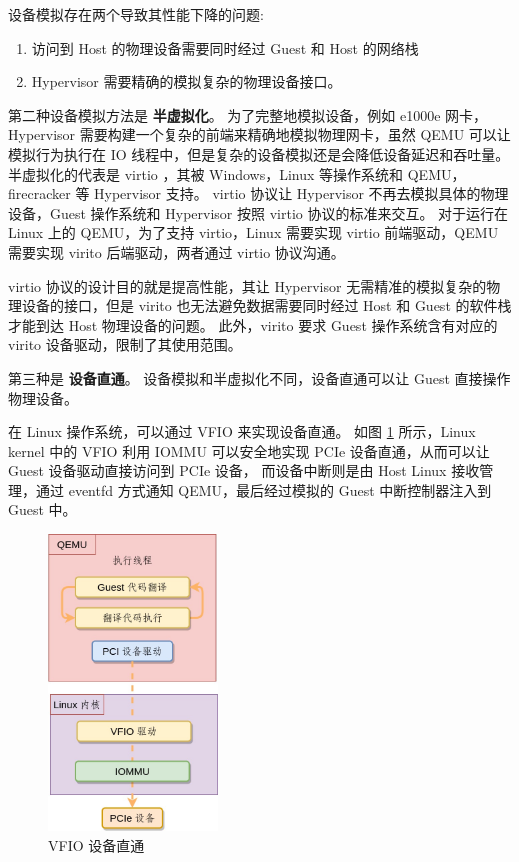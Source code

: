 设备模拟存在两个导致其性能下降的问题:
\begin{enumerate}
	\item 访问到 Host 的物理设备需要同时经过 Guest 和 Host 的网络栈
	\item Hypervisor 需要精确的模拟复杂的物理设备接口。
\end{enumerate}

第二种设备模拟方法是 \textbf{半虚拟化}。
为了完整地模拟设备，例如 e1000e 网卡，Hypervisor 需要构建一个复杂的前端来精确地模拟物理网卡，虽然 QEMU 可以让模拟行为执行在 IO 线程中，但是复杂的设备模拟还是会降低设备延迟和吞吐量。
半虚拟化的代表是 virtio \citep{russell2008virtio}，其被 Windows，Linux 等操作系统和 QEMU，firecracker 等 Hypervisor 支持。
virtio 协议让 Hypervisor 不再去模拟具体的物理设备，Guest 操作系统和 Hypervisor 按照 virtio 协议的标准来交互。
对于运行在 Linux 上的 QEMU，为了支持 virtio，Linux 需要实现 virtio 前端驱动，QEMU 需要实现 virito 后端驱动，两者通过 virtio 协议沟通。

virtio 协议的设计目的就是提高性能，其让 Hypervisor 无需精准的模拟复杂的物理设备的接口，但是 virito 也无法避免数据需要同时经过 Host 和 Guest 的软件栈才能到达 Host 物理设备的问题。
此外，virito 要求 Guest 操作系统含有对应的 virito 设备驱动，限制了其使用范围。

第三种是 \textbf{设备直通}。 设备模拟和半虚拟化不同，设备直通可以让 Guest 直接操作物理设备。

在 Linux 操作系统，可以通过 VFIO \citep{williamson2012vfio} 来实现设备直通。
如图 \ref{fig:vfio} 所示，Linux kernel 中的 VFIO 利用 IOMMU 可以安全地实现 PCIe 设备直通，从而可以让 Guest 设备驱动直接访问到 PCIe 设备，
而设备中断则是由 Host Linux 接收管理，通过 eventfd 方式通知 QEMU，最后经过模拟的 Guest 中断控制器注入到 Guest 中。

\begin{figure}[!htbp]
	\centering
	\includegraphics[width=0.4\textwidth]{./images/vfio.jpg}
	\caption{VFIO 设备直通}
	\label{fig:vfio}
\end{figure}

